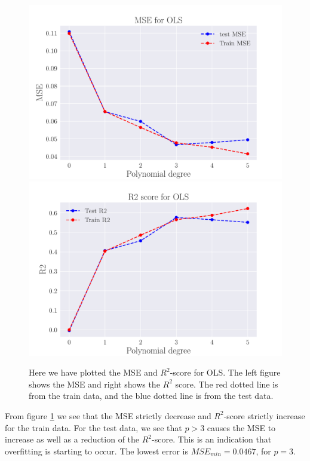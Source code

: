 \documentclass[reprint,english,notitlepage,aps,nobalancelastpage,nofootinbib]{revtex4-1}  %
\begin{document}
\begin{figure}[h]
	\includegraphics[width=\linewidth]{MSE_OLS_n30_eps02_pol5.pdf}
	\endminipage\hfill
	\includegraphics[width=\linewidth]{R2_OLS_n30_eps02_pol5.pdf}
	\endminipage
	\caption{Here we have plotted the MSE and $R^2$-score for OLS. The left figure shows the MSE and right shows the $R^2$ score. The red dotted line is from the train data, and the blue dotted line is from the test data.}\label{fig:OLS_R2_and_MSE}
\end{figure}
From figure \ref{fig:OLS_R2_and_MSE} we see that the MSE strictly decrease and $R^2$-score strictly increase for the train data. For the test data, we see that $p>3$ causes the MSE to increase as well as a reduction of the $R^2$-score. This is an indication that overfitting is starting to occur. The lowest error is $MSE_{min} = 0.0467$, for $p=3$.
\end{document}
